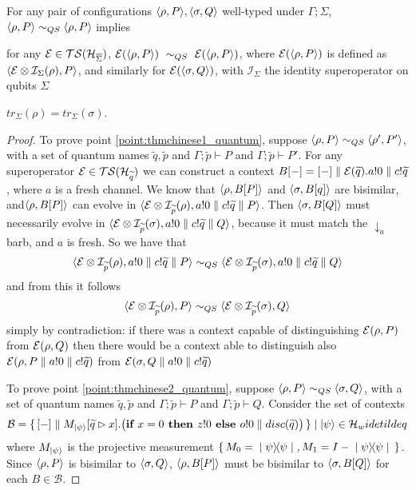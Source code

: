 \begin{theorem}
	For any pair of configurations $\langle\rho, P\rangle, \langle\sigma, Q\rangle$ well-typed under $\Gamma; \Sigma$, 
	$\langle\rho, P\rangle \sim_{QS} \langle\rho, P\rangle$ implies
	\begin{enumerate}
		{\item for any $\mathcal{E} \in \mathcal{TS}(\mathcal{H}_{\overline{\Sigma}})$, $\mathcal{E} (\langle\rho, P\rangle)\ \sim_{QS} \ \mathcal{E} (\langle\rho, P\rangle)$, where $\mathcal{E}(\langle\rho, P\rangle)$ is defined as $\langle\mathcal{E}\otimes\mathcal{I}_\Sigma(\rho), P\rangle$, and similarly for $\mathcal{E}(\langle\sigma, Q\rangle)$, with $\mathcal{I}_\Sigma$ the identity superoperator on qubits $\Sigma$ \label{point:thmchinese1_quantum}}
		{\item $tr_{\Sigma}(\rho) = tr_{\Sigma}(\sigma)$. \label{point:thmchinese2_quantum}}
	\end{enumerate}
\end{theorem}
\begin{proof}
To prove point \ref{point:thmchinese1_quantum}, suppose $\langle\rho, P\rangle \sim_{QS} \langle\rho', P'\rangle$, with a set of quantum names $\widetilde{q}, \widetilde{p}$ and $\Gamma;\widetilde{p} \vdash P$ and $\Gamma;\widetilde{p} \vdash P'$. For any superoperator $\mathcal{E} \in \mathcal{TS}(\mathcal{H}_{\widetilde{q}})$ we can construct a context $B[{-}] = [{-}] \parallel \mathcal{E}({\widetilde{q}}).a!0 \parallel c!\widetilde{q}$, where $a$ is a fresh channel. We know that $\langle\rho, B[P]\rangle$ and $\langle\sigma, B[q]\rangle$ are bisimilar, and$\langle\rho, B[P]\rangle$ can evolve in $\langle\mathcal{E}\otimes\mathcal{I}_{\widetilde{p}}(\rho), a!0 \parallel c!\widetilde{q} \parallel P\rangle$. Then $\langle\sigma, B[Q]\rangle$ must necessarily evolve in $\langle\mathcal{E}\otimes \mathcal{I}_{\widetilde{p}}(\sigma), a!0 \parallel c!\widetilde{q} \parallel Q\rangle$, because it must match the $\downarrow_a$ barb, and $a$ is fresh. So we have that  
\[ \langle\mathcal{E}\otimes\mathcal{I}_{\widetilde{p}}(\rho), a!0 \parallel c!\widetilde{q} \parallel P\rangle \sim_{QS} 
  \langle\mathcal{E}\otimes \mathcal{I}_{\widetilde{p}}(\sigma), a!0 \parallel c!\widetilde{q} \parallel Q\rangle
\]
and from this it follows 
\[ \langle\mathcal{E}\otimes\mathcal{I}_{\widetilde{p}}(\rho), P\rangle \sim_{QS} 
  \langle\mathcal{E}\otimes \mathcal{I}_{\widetilde{p}}(\sigma), Q\rangle
\] simply by contradiction: if there was a context capable of distinguishing $\mathcal{E}(\rho, P)$ from $\mathcal{E}(\rho, Q)$ then there would be a context able to distinguish also $\mathcal{E}(\rho, P \parallel a!0 \parallel c!\widetilde{q})$ from $\mathcal{E}(\sigma, Q \parallel a!0 \parallel c!\widetilde{q})$

To prove point \ref{point:thmchinese2_quantum},  suppose $\langle\rho, P\rangle \sim_{QS} \langle\sigma, Q\rangle$, with a set of quantum names $\widetilde{q}, \widetilde{p}$ and $\Gamma;\widetilde{p} \vdash P$ and $\Gamma;\widetilde{p} \vdash Q$. Consider the set of contexts 
\[\mathcal{B} = \set{[{-}] \parallel M_{\ket{\psi}}[\widetilde{q} \rhd x].\big(\textbf{if } x = 0 \textbf{ then } z!0 \textbf{ else } o!0 \parallel disc(\widetilde{q})\big)} \mid \ket{\psi} \in \mathcal{H}_widetilde{q}\]
where $M_{\ket{\psi}}$ is the projective measurement $\set{M_0 = \ket{\psi}\!\!\bra{\psi}, M_1 = I - \ket{\psi}\!\!\bra{\psi}}$. Since $\langle\rho, P\rangle$ is bisimilar to $\langle\sigma, Q\rangle$, $\langle\rho, B[P]\rangle$ must be bisimilar to $\langle\sigma, B[Q]\rangle$ for each $B \in \mathcal{B}$.
\end{proof}


